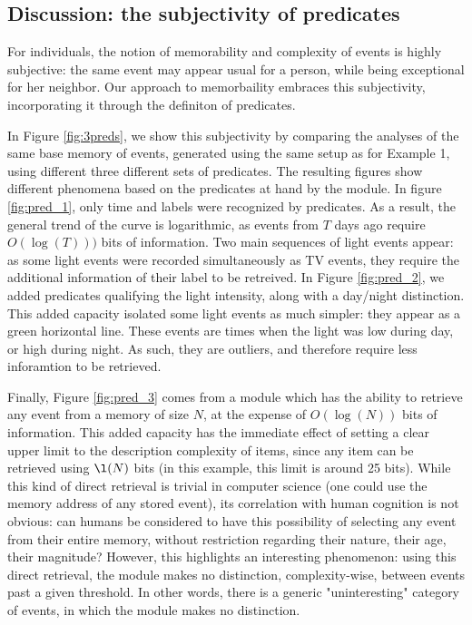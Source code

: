 \documentclass[entropy,article,submit,moreauthors,pdftex]{Definitions/mdpi}
\begin{document}
\subsection{Discussion: the subjectivity of predicates}
For individuals, the notion of memorability and complexity of events is highly subjective: the same event may appear usual for a person, while being exceptional for her neighbor. Our approach to memorbaility embraces this subjectivity, incorporating it through the definiton of predicates.

In Figure \ref{fig:3preds}, we show this subjectivity by comparing the analyses of the same base memory of events, generated using the same setup as for Example 1, using different three different sets of predicates. The resulting figures show different phenomena based on the predicates at hand by the module. In figure \ref{fig:pred_1}, only time and labels were recognized by predicates. As a result, the general trend of the curve is logarithmic, as events from $T$ days ago require $O(\log(T)))$ bits of information. Two main sequences of light events appear: as some light events were recorded simultaneously as TV events, they require the additional information of their label to be retreived. In Figure \ref{fig:pred_2}, we added predicates qualifying the light intensity, along with a day/night distinction. This added capacity isolated some light events as much simpler: they appear as a green horizontal line. These events are times when the light was low during day, or high during night. As such, they are outliers, and therefore require less inforamtion to be retrieved.

Finally, Figure \ref{fig:pred_3} comes from a module which has the ability to retrieve any event from a memory of size $N$, at the expense of $O(\log(N))$ bits of information. This added capacity has the immediate effect of setting a clear upper limit to the description complexity of items, since any item can be retrieved using $\l(N)$ bits (in this example, this limit is around 25 bits). While this kind of direct retrieval is trivial in computer science (one could use the memory address of any stored event), its correlation with human cognition is not obvious: can humans be considered to have this possibility of selecting any event from their entire memory, without restriction regarding their nature, their age, their magnitude? However, this highlights an interesting phenomenon: using this direct retrieval, the module makes no distinction, complexity-wise, between events past a given threshold. In other words, there is a generic "uninteresting" category of events, in which the module makes no distinction.
\end{document}
